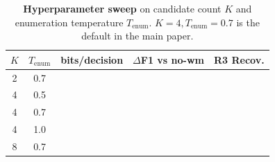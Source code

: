 \begin{table}[t]
\centering
\small
\setlength{\tabcolsep}{4pt}
\begin{tabular}{ccccc}
\toprule
$K$ & $T_{\text{enum}}$ & bits/decision & $\Delta$F1 vs no-wm & R3 Recov. \\
\midrule
2 & 0.7 & \todo{} & \todo{} & \todo{} \\
4 & 0.5 & \todo{} & \todo{} & \todo{} \\
4 & 0.7 & \todo{} & \todo{} & \todo{} \\
4 & 1.0 & \todo{} & \todo{} & \todo{} \\
8 & 0.7 & \todo{} & \todo{} & \todo{} \\
\bottomrule
\end{tabular}
\caption{\textbf{Hyperparameter sweep} on candidate count $K$ and
enumeration temperature $T_{\text{enum}}$. $K{=}4, T_{\text{enum}}{=}0.7$
is the default in the main paper.}
\label{tab:hyperparam}
\end{table}
